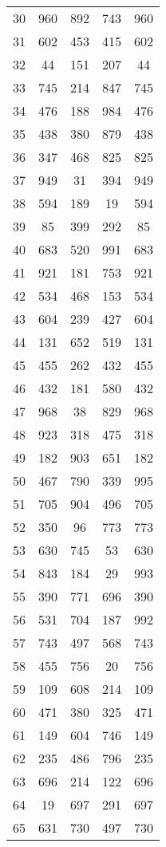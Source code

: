 \documentclass[a4paper,10pt,ngerman]{scrartcl}
\begin{document}
\begin{longtable}[c]{c|c|c|c|c}
    30 & 960 & 892 & 743 & 960 \\
    31 & 602 & 453 & 415 & 602 \\
    32 & 44 & 151 & 207 & 44 \\
    33 & 745 & 214 & 847 & 745 \\
    34 & 476 & 188 & 984 & 476 \\
    35 & 438 & 380 & 879 & 438 \\
    36 & 347 & 468 & 825 & 825 \\
    37 & 949 & 31 & 394 & 949 \\
    38 & 594 & 189 & 19 & 594 \\
    39 & 85 & 399 & 292 & 85 \\
    40 & 683 & 520 & 991 & 683 \\
    41 & 921 & 181 & 753 & 921 \\
    42 & 534 & 468 & 153 & 534 \\
    43 & 604 & 239 & 427 & 604 \\
    44 & 131 & 652 & 519 & 131 \\
    45 & 455 & 262 & 432 & 455 \\
    46 & 432 & 181 & 580 & 432 \\
    47 & 968 & 38 & 829 & 968 \\
    48 & 923 & 318 & 475 & 318 \\
    49 & 182 & 903 & 651 & 182 \\
    50 & 467 & 790 & 339 & 995 \\
    51 & 705 & 904 & 496 & 705 \\
    52 & 350 & 96 & 773 & 773 \\
    53 & 630 & 745 & 53 & 630 \\
    54 & 843 & 184 & 29 & 993 \\
    55 & 390 & 771 & 696 & 390 \\
    56 & 531 & 704 & 187 & 992 \\
    57 & 743 & 497 & 568 & 743 \\
    58 & 455 & 756 & 20 & 756 \\
    59 & 109 & 608 & 214 & 109 \\
    60 & 471 & 380 & 325 & 471 \\
    61 & 149 & 604 & 746 & 149 \\
    62 & 235 & 486 & 796 & 235 \\
    63 & 696 & 214 & 122 & 696 \\
    64 & 19 & 697 & 291 & 697 \\
    65 & 631 & 730 & 497 & 730 \\

\end{longtable}
\end{document}
